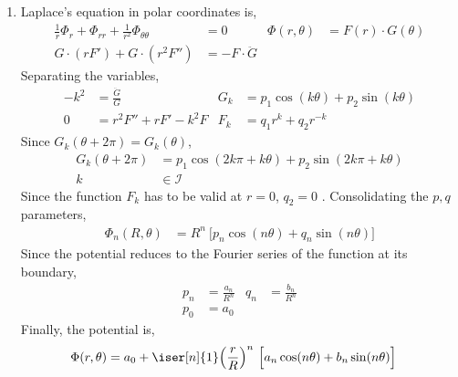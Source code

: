 \begin{enumerate}
\begin{enumerate}
              \item Laplace's equation in polar coordinates is,
                    \begin{align}
                        \frac{1}{r} \Phi_r + \Phi_{rr} + \frac{1}{r^2}
                        \Phi_{\theta\theta} & = 0
                                            &
                        \Phi(r, \theta)     & = F(r) \cdot G(\theta) \\
                        G \cdot (rF') + G \cdot (r^2 F'')
                                            & = -F \cdot \ddot{G}
                    \end{align}
                    Separating the variables,
                    \begin{align}
                        -k^2 & = \frac{\ddot{G}}{G}                   &
                        G_k  & = p_1 \cos(k\theta) + p_2\sin(k\theta)   \\
                        0    & = r^2 F'' + r F' - k^2 F               &
                        F_k  & = q_1 r^k + q_2 r^{-k}
                    \end{align}
                    Since $ G_k(\theta + 2\pi) = G_k(\theta) $,
                    \begin{align}
                        G_k (\theta + 2\pi) & = p_1\cos(2k\pi + k\theta)
                        + p_2\sin(2k\pi + k\theta)                       \\
                        k                   & \in \mathcal{I}
                    \end{align}
                    Since the function $ F_k $ has to be valid at $ r = 0 $, $ q_2 = 0 $
                    . Consolidating the $ p, q $ parameters,
                    \begin{align}
                        \Phi_n(R, \theta) & = R^n\ \Big[ p_n \cos(n\theta)
                            + q_n \sin(n\theta) \Big]
                    \end{align}
                    Since the potential reduces to the Fourier series of the function
                    at its boundary,
                    \begin{align}
                        p_n & = \frac{a_n}{R^n} & q_n & = \frac{b_n}{R^n} \\
                        p_0 & = a_0
                    \end{align}
                    Finally, the potential is,
                    \begin{align}
                        \Phi(r, \theta) & = a_0 + \iser[n]{1} \Big( \frac{r}{R} \Big)^n
                        \ \Big[ a_n \cos(n\theta) + b_n \sin(n\theta) \Big]
                    \end{align}


\end{enumerate}
\end{enumerate}
